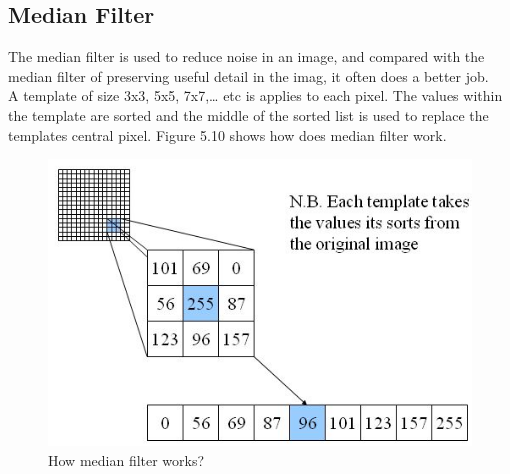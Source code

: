 \subsection{Median Filter}
The median filter is used to reduce noise in an image, and compared with the median filter of preserving useful detail in the imag, it often does a better job.\\

A template of size 3x3, 5x5, 7x7,… etc is applies to each pixel. The values within the template are sorted and the middle of the sorted list is used to replace the templates central pixel. Figure 5.10 shows how does median filter work\cite{computervision}.
\begin{figure}[!htb]
	\centering
	\includegraphics[scale=0.8]{img/medianfilterprocess}
	\caption{ How median filter works?}
\end{figure}


